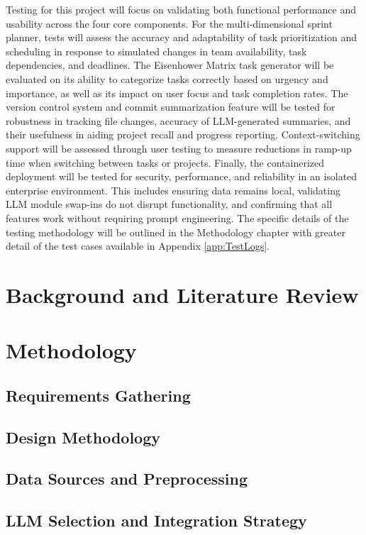 \documentclass{report}
\begin{document}
Testing for this project will focus on validating both functional performance and usability across the four core components. For the multi-dimensional sprint planner, tests will assess the accuracy and adaptability of task prioritization and scheduling in response to simulated changes in team availability, task dependencies, and deadlines. The Eisenhower Matrix task generator will be evaluated on its ability to categorize tasks correctly based on urgency and importance, as well as its impact on user focus and task completion rates.
The version control system and commit summarization feature will be tested for robustness in tracking file changes, accuracy of LLM-generated summaries, and their usefulness in aiding project recall and progress reporting. Context-switching support will be assessed through user testing to measure reductions in ramp-up time when switching between tasks or projects.
Finally, the containerized deployment will be tested for security, performance, and reliability in an isolated enterprise environment. This includes ensuring data remains local, validating LLM module swap-ins do not disrupt functionality, and confirming that all features work without requiring prompt engineering. The specific details of the testing methodology will be outlined in the Methodology chapter with greater detail of the test cases available in Appendix \ref{app:TestLogs}.

\chapter{Background and Literature Review}  %


\chapter{Methodology}  %
\section{Requirements Gathering}
\section{Design Methodology}
\section{Data Sources and Preprocessing}
\section{LLM Selection and Integration Strategy}
\end{document}
